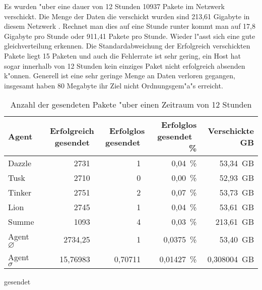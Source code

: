 Es wurden "uber eine dauer von 12 Stunden 10937 Pakete im Netzwerk verschickt. Die Menge der Daten die verschickt wurden sind 213,61 Gigabyte in diesem Netzwerk . %
Rechnet man dies auf eine Stunde runter kommt man auf 17,8 Gigabyte pro Stunde oder 911,41 Pakete pro Stunde. Wieder l"asst sich eine gute gleichverteilung erkennen. %
Die Standardabweichung der Erfolgreich verschickten Pakete liegt 15 Paketen und auch die Fehlerrate ist sehr gering, ein Host %
hat sogar innerhalb von 12 Stunden kein einziges Paket nicht erfolgreich absenden k"onnen. Generell ist eine sehr geringe Menge an Daten verloren %
gegangen, insgesamt haben 80 Megabyte ihr Ziel nicht Ordnungsgem"a"s erreicht. %
\begin{table}
\centering
\begin{tabular}{l%
 r<{\,}%
 r<{\,}%
 r<{\,\%}%
 r<{\,GB}%
}
Agent  				& Erfolgreich gesendet			& Erfolglos gesendet			& Erfolglos gesendet	& Verschickte	\\
\hline
Dazzle 				& 2731			 		& 1					& 0,04			& 53,34			\\
Tusk 				& 2710					& 0					& 0,00			& 52,93			\\
Tinker				& 2751					& 2					& 0,07			& 53,73			\\
Lion				& 2745					& 1					& 0,04			& 53,61			\\ 
Summe				& 1093					& 4					& 0,03 			& 213,61		\\
Agent $\diameter $  		& 2734,25				& 1				 	& 0,0375		& 53,40 		\\   
Agent $\sigma $			& 15,76983	 			& 0,70711				& 0,01427      		& 0,308004		\\
\end{tabular}
gesendet\caption{Anzahl der gesendeten Pakete "uber einen Zeitraum von 12 Stunden}
\label{tab:VerschickteDaten20Mb}
\end{table}





